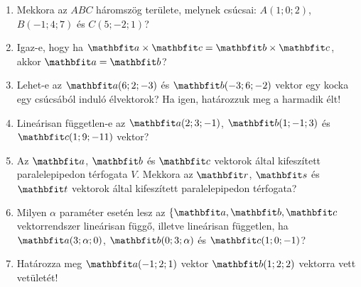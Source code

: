 \documentclass[a4paper, 12pt]{scrartcl}
\begin{document}
\begin{enumerate}
  \item Mekkora az $ABC$ háromszög területe, melynek csúcsai: $A(1; 0; 2)$,
        $B(-1; 4; 7)$ és $C(5; -2; 1)$?

  \item Igaz-e, hogy ha $\rvec a \times \rvec c = \rvec b \times \rvec c$, akkor
        $\rvec a = \rvec b$?

  \item Lehet-e az $\rvec a(6; 2; -3)$ és $\rvec b(-3; 6; -2)$ vektor egy kocka
        egy csúcsából induló élvektorok? Ha igen, határozzuk meg a harmadik élt!

  \item Lineárisan független-e az $\rvec a(2; 3; -1)$, $\rvec b(1; -1; 3)$
        és $\rvec c(1; 9; -11)$ vektor?

  \item Az $\rvec a$, $\rvec b$ és $\rvec c$ vektorok által kifeszített
        paralelepipedon térfogata $V$. Mekkora az $\rvec r$, $\rvec s$ és
        $\rvec t$ vektorok által kifeszített paralelepipedon térfogata?

  \item Milyen $\alpha$ paraméter esetén lesz az $\{ \rvec a, \rvec b, \rvec c$
        vektorrendszer lineárisan függő, illetve lineárisan független, ha
        $\rvec a (3; \alpha; 0)$, $\rvec b (0; 3; \alpha)$ és $\rvec c
          (1; 0; -1)$?

  \item Határozza meg $\rvec a(-1; 2; 1)$ vektor $\rvec b(1; 2; 2)$ vektorra
        vett vetületét!
\end{enumerate}

\end{document}
